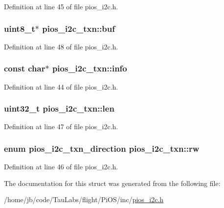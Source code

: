 \-Definition at line 45 of file pios\-\_\-i2c.\-h.

\hypertarget{structpios__i2c__txn_a0d544e19d0f73acb6bf43743bc5e1480}{
\subsubsection[{buf}]{\setlength{\rightskip}{0pt plus 5cm}uint8\-\_\-t$\ast$ {\bf pios\-\_\-i2c\-\_\-txn\-::buf}}}\label{structpios__i2c__txn_a0d544e19d0f73acb6bf43743bc5e1480}


\-Definition at line 48 of file pios\-\_\-i2c.\-h.

\hypertarget{structpios__i2c__txn_a202db3e74679d070f4f3d27c1dcb0f39}{
\subsubsection[{info}]{\setlength{\rightskip}{0pt plus 5cm}const char$\ast$ {\bf pios\-\_\-i2c\-\_\-txn\-::info}}}\label{structpios__i2c__txn_a202db3e74679d070f4f3d27c1dcb0f39}


\-Definition at line 44 of file pios\-\_\-i2c.\-h.

\hypertarget{structpios__i2c__txn_af238133c1e4df913933e48fc29c5510b}{
\subsubsection[{len}]{\setlength{\rightskip}{0pt plus 5cm}uint32\-\_\-t {\bf pios\-\_\-i2c\-\_\-txn\-::len}}}\label{structpios__i2c__txn_af238133c1e4df913933e48fc29c5510b}


\-Definition at line 47 of file pios\-\_\-i2c.\-h.

\hypertarget{structpios__i2c__txn_a604f5e93b6ae3da9573915bc03bb1821}{
\subsubsection[{rw}]{\setlength{\rightskip}{0pt plus 5cm}enum {\bf pios\-\_\-i2c\-\_\-txn\-\_\-direction} {\bf pios\-\_\-i2c\-\_\-txn\-::rw}}}\label{structpios__i2c__txn_a604f5e93b6ae3da9573915bc03bb1821}


\-Definition at line 46 of file pios\-\_\-i2c.\-h.



\-The documentation for this struct was generated from the following file\-:\begin{DoxyCompactItemize}
\item 
/home/jb/code/\-Tau\-Labs/flight/\-Pi\-O\-S/inc/\hyperlink{_pi_o_s_2inc_2pios__i2c_8h}{pios\-\_\-i2c.\-h}\end{DoxyCompactItemize}
